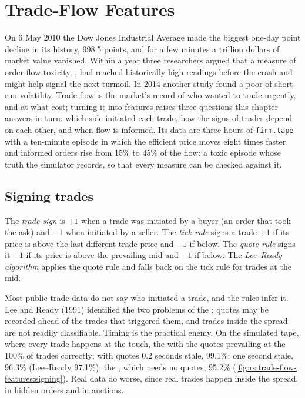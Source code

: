 \chapter{Trade-Flow Features}\label{ch:rs:trade-flow-features}

On 6 May 2010 the Dow Jones Industrial Average made the biggest one-day point decline in its history, 998.5 points, and for a few
minutes a trillion dollars of market value vanished. Within a year three researchers argued that a measure of order-flow toxicity, ,
had reached historically high readings before the crash and might help signal the next turmoil. In 2014 another study found  a poor
 of short-run volatility. Trade flow is the market's record of who wanted to trade urgently, and at what cost; turning it into
features raises three questions this chapter answers in turn: which side initiated each trade, how the signs of trades depend
on each other, and when flow is informed. Its data are three hours of \texttt{firm.tape} with a ten-minute episode in which the
efficient price moves eight times faster and informed orders rise from 15\% to 45\% of the flow: a toxic episode whose truth the
simulator records, so that every measure can be checked against it.

\section{Signing trades}

\begin{definition}\label{def:rs:trade-flow-features:sign}
The \emph{trade sign} is $+1$ when a trade was initiated by a buyer (an order that took the ask) and $-1$ when
initiated by a seller. The \emph{tick rule} signs a trade $+1$ if its price is above the last different trade
price and $-1$ if below. The \emph{quote rule} signs it $+1$ if its price is above the prevailing mid and $-1$
if below. The \emph{Lee--Ready algorithm} applies the quote rule and falls back on the tick rule
for trades at the mid.
\end{definition}

Most public trade data do not say who initiated a trade, and the rules infer it. Lee and Ready (1991) identified the two
problems of the : quotes may be recorded ahead of the trades that triggered them, and trades inside the spread are not
readily classifiable. Timing is the practical enemy. On the simulated tape, where every trade happens at the touch, the  with the quotes prevailing at the  100\% of trades correctly; with quotes 0.2 seconds stale, 99.1\%; one second
stale, 96.3\% (Lee--Ready 97.1\%); the , which needs no quotes, 95.2\%
(\cref{fig:rs:trade-flow-features:signing}). Real data do worse, since real trades happen inside the spread, in hidden orders and
in auctions.


